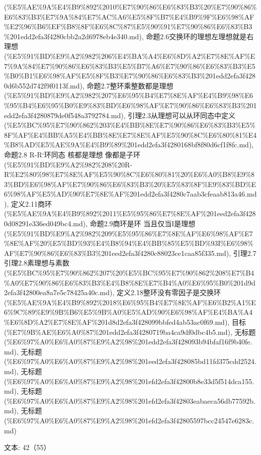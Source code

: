 \begin{note}[环]
(\%E5\%AE\%9A\%E4\%B9\%892\%2010\%E7\%90\%86\%E6\%83\%B3\%20\%E7\%90\%86\%E6\%83\%B3\%E7\%9A\%84\%E7\%AC\%A6\%E5\%8F\%B7\%E4\%B9\%9F\%E6\%98\%AF\%E2\%96\%B6\%EF\%B8\%8F\%E6\%8C\%87\%E5\%90\%91\%E7\%90\%86\%E6\%83\%B3\%201edd2efa3f4280cbb2a2d6978eb4e340.md), 命题2.6交换环的理想左理想就是右理想 (\%E5\%91\%BD\%E9\%A2\%982\%206\%E4\%BA\%A4\%E6\%8D\%A2\%E7\%8E\%AF\%E7\%9A\%84\%E7\%90\%86\%E6\%83\%B3\%E5\%B7\%A6\%E7\%90\%86\%E6\%83\%B3\%E5\%B0\%B1\%E6\%98\%AF\%E5\%8F\%B3\%E7\%90\%86\%E6\%83\%B3\%201edd2efa3f4280d6b552d742f9f0113f.md), 命题2.7整环乘整数都是理想 (\%E5\%91\%BD\%E9\%A2\%982\%207\%E6\%95\%B4\%E7\%8E\%AF\%E4\%B9\%98\%E6\%95\%B4\%E6\%95\%B0\%E9\%83\%BD\%E6\%98\%AF\%E7\%90\%86\%E6\%83\%B3\%201edd2efa3f4280879de0f548a3792784.md), 引理2.3从理想可以从环同态中定义 (\%E5\%BC\%95\%E7\%90\%862\%203\%E4\%BB\%8E\%E7\%90\%86\%E6\%83\%B3\%E5\%8F\%AF\%E4\%BB\%A5\%E4\%BB\%8E\%E7\%8E\%AF\%E5\%90\%8C\%E6\%80\%81\%E4\%B8\%AD\%E5\%AE\%9A\%E4\%B9\%89\%201edd2efa3f4280168bf8f80d6cf1f8fc.md), 命题2.8 R-R‘环同态 核都是理想 像都是子环 (\%E5\%91\%BD\%E9\%A2\%982\%208\%20R-R\%E2\%80\%98\%E7\%8E\%AF\%E5\%90\%8C\%E6\%80\%81\%20\%E6\%A0\%B8\%E9\%83\%BD\%E6\%98\%AF\%E7\%90\%86\%E6\%83\%B3\%20\%E5\%83\%8F\%E9\%83\%BD\%E6\%98\%AF\%E5\%AD\%90\%E7\%8E\%AF\%201edd2efa3f4280c7aab3cfeaab813a46.md), 定义2.11商环 (\%E5\%AE\%9A\%E4\%B9\%892\%2011\%E5\%95\%86\%E7\%8E\%AF\%201eed2efa3f4280d08291e336ed049bc4.md), 命题2.9商环是环 当且仅当I是理想 (\%E5\%91\%BD\%E9\%A2\%982\%209\%E5\%95\%86\%E7\%8E\%AF\%E6\%98\%AF\%E7\%8E\%AF\%20\%E5\%BD\%93\%E4\%B8\%94\%E4\%BB\%85\%E5\%BD\%93I\%E6\%98\%AF\%E7\%90\%86\%E6\%83\%B3\%201eed2efa3f4280c88023ce1caa85f335.md), 引理2.7 引理2.8素理想与素数 (\%E5\%BC\%95\%E7\%90\%862\%207\%20\%E5\%BC\%95\%E7\%90\%862\%208\%E7\%B4\%A0\%E7\%90\%86\%E6\%83\%B3\%E4\%B8\%8E\%E7\%B4\%A0\%E6\%95\%B0\%201d9d2efa3f42800ea8a7e5c78425a40c.md), 定义2.18整环没有零因子是交换环 (\%E5\%AE\%9A\%E4\%B9\%892\%2018\%E6\%95\%B4\%E7\%8E\%AF\%E6\%B2\%A1\%E6\%9C\%89\%E9\%9B\%B6\%E5\%9B\%A0\%E5\%AD\%90\%E6\%98\%AF\%E4\%BA\%A4\%E6\%8D\%A2\%E7\%8E\%AF\%201d8d2efa3f428099bbfed4ab53ac0f69.md), 目标 (\%E7\%9B\%AE\%E6\%A0\%87\%201edd2efa3f4280719ba4ca9df0dbc4b5.md), 无标题 (\%E6\%97\%A0\%E6\%A0\%87\%E9\%A2\%98\%201edd2efa3f428093b94bfaf16f9b40fe.md), 无标题 (\%E6\%97\%A0\%E6\%A0\%87\%E9\%A2\%98\%201eed2efa3f428085bd11fd375cdd2524.md), 无标题 (\%E6\%97\%A0\%E6\%A0\%87\%E9\%A2\%98\%201efd2efa3f42800b8e33d5f514dca155.md), 无标题 (\%E6\%97\%A0\%E6\%A0\%87\%E9\%A2\%98\%201efd2efa3f42803eabaeca56db77592b.md), 无标题 (\%E6\%97\%A0\%E6\%A0\%87\%E9\%A2\%98\%201efd2efa3f42805597bcc24547e6283c.md)

文本: 42（55）

\end{note}

